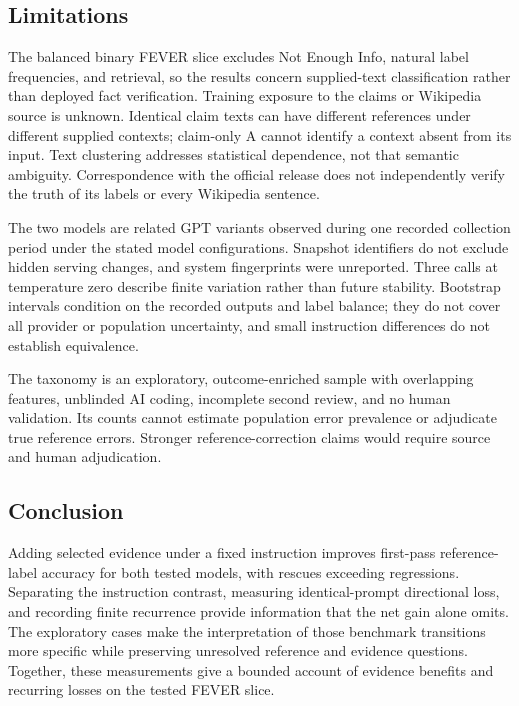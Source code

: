 \documentclass[11pt,letterpaper]{article}
\begin{document}
\subsection{Limitations}
The balanced binary FEVER slice excludes Not Enough Info, natural label frequencies, and retrieval, so the results concern supplied-text classification rather than deployed fact verification. Training exposure to the claims or Wikipedia source is unknown. Identical claim texts can have different references under different supplied contexts; claim-only A cannot identify a context absent from its input. Text clustering addresses statistical dependence, not that semantic ambiguity. Correspondence with the official release does not independently verify the truth of its labels or every Wikipedia sentence.

The two models are related GPT variants observed during one recorded collection period under the stated model configurations. Snapshot identifiers do not exclude hidden serving changes, and system fingerprints were unreported. Three calls at temperature zero describe finite variation rather than future stability. Bootstrap intervals condition on the recorded outputs and label balance; they do not cover all provider or population uncertainty, and small instruction differences do not establish equivalence.

The taxonomy is an exploratory, outcome-enriched sample with overlapping features, unblinded AI coding, incomplete second review, and no human validation. Its counts cannot estimate population error prevalence or adjudicate true reference errors. Stronger reference-correction claims would require source and human adjudication.

\subsection{Conclusion}
Adding selected evidence under a fixed instruction improves first-pass reference-label accuracy for both tested models, with rescues exceeding regressions. Separating the instruction contrast, measuring identical-prompt directional loss, and recording finite recurrence provide information that the net gain alone omits. The exploratory cases make the interpretation of those benchmark transitions more specific while preserving unresolved reference and evidence questions. Together, these measurements give a bounded account of evidence benefits and recurring losses on the tested FEVER slice.
\end{document}
